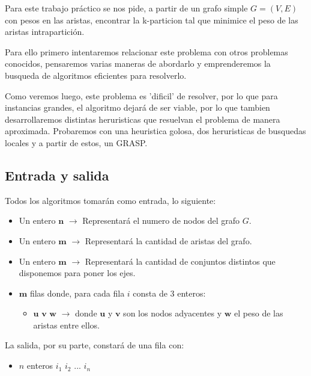 Para este trabajo práctico se nos pide, a partir de un grafo simple $G=(V,E)$ con pesos en las aristas, encontrar la k-particion tal que minimice el peso de las aristas intrapartición.

Para ello primero intentaremos relacionar este problema con otros problemas conocidos, pensaremos varias maneras de abordarlo y emprenderemos la busqueda de algoritmos eficientes para resolverlo.

Como veremos luego, este problema es 'dificil' de resolver, por lo que para instancias grandes, el algoritmo dejará de ser viable, por lo que tambien desarrollaremos distintas heruristicas que resuelvan el problema de manera aproximada. Probaremos con una heuristica golosa, dos heruristicas de busquedas locales y a partir de estos, un GRASP.

\subsection{Entrada y salida}

Todos los algoritmos tomarán como entrada, lo siguiente:

\begin{itemize}
	\item Un entero $\textbf{n}$ $\rightarrow$ Representará el numero de nodos del grafo $G$.

	\item Un entero $\textbf{m}$ $\rightarrow$ Representará la cantidad de aristas del grafo.

	\item Un entero $\textbf{m}$ $\rightarrow$ Representará la cantidad de conjuntos distintos que disponemos para poner los ejes.

	\item $\textbf{m}$ filas donde, para cada fila $i$ consta de $3$ enteros:
	\begin{itemize}
		\item $\textbf{u v w}$ $ \rightarrow $ donde $\textbf{u}$ y $\textbf{v}$ son los nodos adyacentes y $\textbf{w}$ el peso de las aristas entre ellos.
	\end{itemize}
\end{itemize}

La salida, por su parte, constar\'a de una fila con:

\begin{itemize}

	\item $n$ enteros $i_1$ $i_2$ $...$ $i_n$

\end{itemize}

